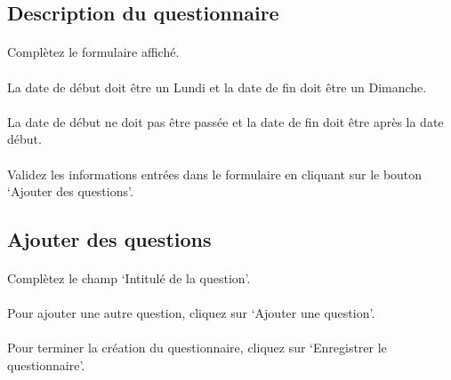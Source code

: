 \documentclass[french,12pt,a4paper,openany]{book}
\begin{document}
			\subsection{Description du questionnaire}
				\paragraph{}{Complètez le formulaire affiché.}
				\paragraph{}{La date de début doit être un Lundi et la date de fin doit être un Dimanche.}
				\paragraph{}{La date de début ne doit pas être passée et la date de fin doit être après la date début.}
				\paragraph{}{Validez les informations entrées dans le formulaire en cliquant sur le bouton `Ajouter des questions'.}
			\subsection{Ajouter des questions}
				\paragraph{}{Complètez le champ `Intitulé de la question'.}
				\paragraph{}{Pour ajouter une autre question, cliquez sur `Ajouter une question'.}
				\paragraph{}{Pour terminer la création du questionnaire, cliquez sur `Enregistrer le questionnaire'.}
\end{document}
